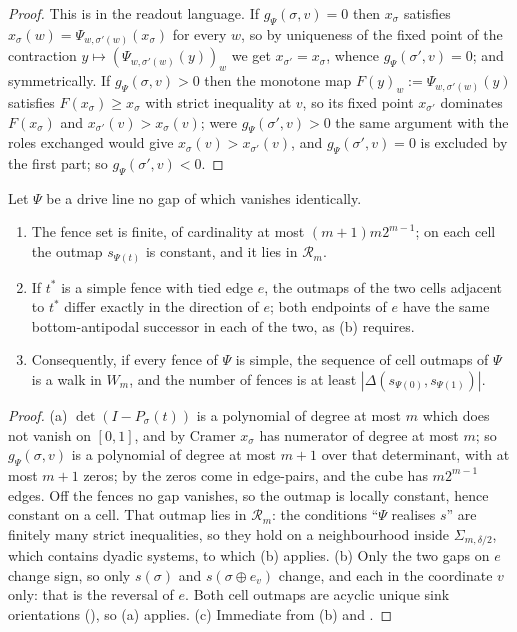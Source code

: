 \begin{proof}
This is  in the readout language. If $g_\Psi(\sigma,v)=0$
then $x_\sigma$ satisfies $x_\sigma(w)=\Psi_{w,\sigma'(w)}(x_\sigma)$ for
every $w$, so by uniqueness of the fixed point of the contraction
$y\mapsto(\Psi_{w,\sigma'(w)}(y))_w$ we get $x_{\sigma'}=x_\sigma$, whence
$g_\Psi(\sigma',v)=0$; and symmetrically. If $g_\Psi(\sigma,v)>0$ then the
monotone map $F(y)_w:=\Psi_{w,\sigma'(w)}(y)$ satisfies $F(x_\sigma)\ge
x_\sigma$ with strict inequality at $v$, so its fixed point $x_{\sigma'}$
dominates $F(x_\sigma)$ and $x_{\sigma'}(v)>x_\sigma(v)$; were
$g_\Psi(\sigma',v)>0$ the same argument with the roles exchanged would give
$x_\sigma(v)>x_{\sigma'}(v)$, and $g_\Psi(\sigma',v)=0$ is excluded by the
first part; so $g_\Psi(\sigma',v)<0$.
\end{proof}

\begin{theorem}\label{mw:cells}
Let $\Psi$ be a drive line no gap of which vanishes identically.
\begin{enumerate}[label=(\alph*),leftmargin=2.2em]
\item The fence set is finite, of cardinality at most $(m+1)m2^{m-1}$; on
      each cell the outmap $s_{\Psi(t)}$ is constant, and it lies in
      $\mathcal R_m$.
\item If $t^{\ast}$ is a simple fence with tied edge $e$, the outmaps of the
      two cells adjacent to $t^{\ast}$ differ exactly in the direction of
      $e$; both endpoints of $e$ have the same bottom-antipodal successor in
      each of the two, as (b) requires.
\item Consequently, if every fence of $\Psi$ is simple, the sequence of cell
      outmaps of $\Psi$ is a walk in $W_m$, and the number of fences is at
      least $|\Delta(s_{\Psi(0)},s_{\Psi(1)})|$.
\end{enumerate}
\end{theorem}

\begin{proof}
(a) $\det(I-P_\sigma(t))$ is a polynomial of degree at most $m$ which does not
vanish on $[0,1]$, and by Cramer $x_\sigma$ has numerator of degree at most
$m$; so $g_\Psi(\sigma,v)$ is a polynomial of degree at most $m+1$ over that
determinant, with at most $m+1$ zeros; by  the zeros come
in edge-pairs, and the cube has $m2^{m-1}$ edges. Off the fences no gap
vanishes, so the outmap is locally constant, hence constant on a cell. That
outmap lies in $\mathcal R_m$: the conditions ``$\Psi$ realises $s$'' are
finitely many strict inequalities, so they hold on a neighbourhood inside
$\Sigma_{m,\delta/2}$, which contains dyadic systems, to which
(b) applies.
(b) Only the two gaps on $e$ change sign, so only $s(\sigma)$ and
$s(\sigma\oplus e_v)$ change, and each in the coordinate $v$ only: that is
the reversal of $e$. Both cell outmaps are acyclic unique sink orientations
(), so (a) applies.
(c) Immediate from (b) and .
\end{proof}

